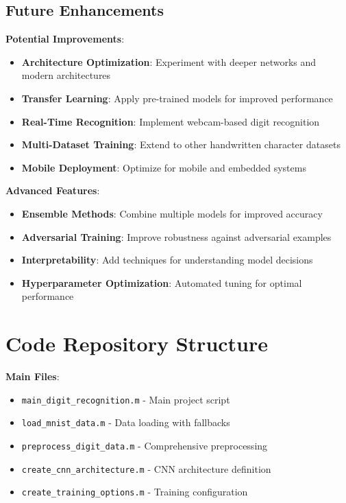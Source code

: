 \documentclass[12pt,a4paper]{article}
\begin{document}
\subsection{Future Enhancements}

\textbf{Potential Improvements}:
\begin{itemize}
    \item \textbf{Architecture Optimization}: Experiment with deeper networks and modern architectures
    \item \textbf{Transfer Learning}: Apply pre-trained models for improved performance
    \item \textbf{Real-Time Recognition}: Implement webcam-based digit recognition
    \item \textbf{Multi-Dataset Training}: Extend to other handwritten character datasets
    \item \textbf{Mobile Deployment}: Optimize for mobile and embedded systems
\end{itemize}

\textbf{Advanced Features}:
\begin{itemize}
    \item \textbf{Ensemble Methods}: Combine multiple models for improved accuracy
    \item \textbf{Adversarial Training}: Improve robustness against adversarial examples
    \item \textbf{Interpretability}: Add techniques for understanding model decisions
    \item \textbf{Hyperparameter Optimization}: Automated tuning for optimal performance
\end{itemize}

\section{Code Repository Structure}

\textbf{Main Files}:
\begin{itemize}
    \item \texttt{main\_digit\_recognition.m} - Main project script
    \item \texttt{load\_mnist\_data.m} - Data loading with fallbacks
    \item \texttt{preprocess\_digit\_data.m} - Comprehensive preprocessing
    \item \texttt{create\_cnn\_architecture.m} - CNN architecture definition
    \item \texttt{create\_training\_options.m} - Training configuration
\end{itemize}
\end{document}
